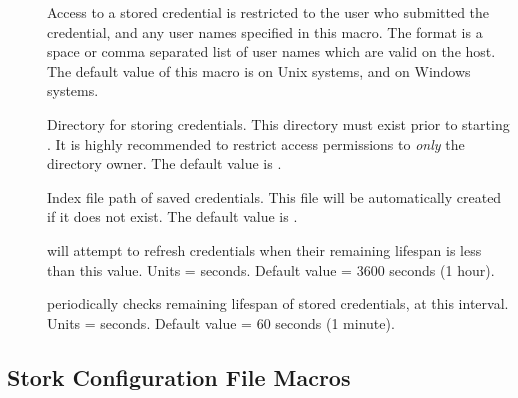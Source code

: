 \begin{description}

\item[]
\label{param:CreddSuperUsers}   Access to a stored credential is
restricted to the user who submitted the credential, and any user
names specified in this macro.  The format is a space or comma
separated list of user names which are valid on the 
host.
The default value of this macro is  on Unix systems, and
 on Windows systems.

\item[]
\label{param:CredStoreDir}   Directory for storing credentials.  This
directory must exist prior to starting .  It is highly
recommended to restrict access permissions to \emph{only} the
directory owner.
The default value is
.

\item[]
\label{param:CredIndexFile}   Index file path of saved credentials.
This file will be automatically created if it does not exist.
The default value is
.

\item[]
\label{param:DefaultCredExpireThreshold}   will attempt
to refresh credentials when their remaining lifespan is less than this
value.
Units = seconds.  Default value = 3600 seconds (1 hour).

\item[]
\label{param:CredCheckInterval}  periodically checks
remaining lifespan of stored credentials, at this interval.
Units = seconds.  Default value = 60 seconds (1 minute).

\end{description}

\subsection{\label{sec:Stork-Config-File-Entries}Stork Configuration
File Macros}
 

